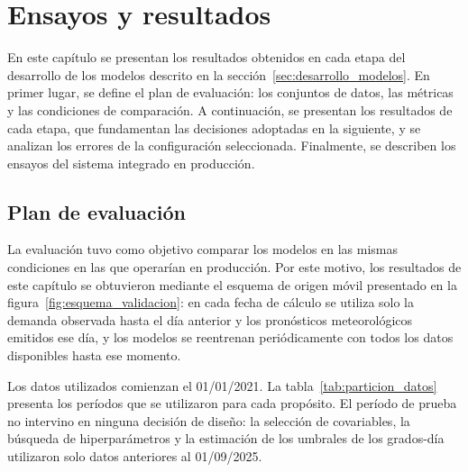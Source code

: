 
\chapter{Ensayos y resultados} %

\label{Chapter4} %

En este capítulo se presentan los resultados obtenidos en cada etapa del desarrollo de los modelos descrito en la sección~\ref{sec:desarrollo_modelos}. En primer lugar, se define el plan de evaluación: los conjuntos de datos, las métricas y las condiciones de comparación. A continuación, se presentan los resultados de cada etapa, que fundamentan las decisiones adoptadas en la siguiente, y se analizan los errores de la configuración seleccionada. Finalmente, se describen los ensayos del sistema integrado en producción.

\section{Plan de evaluación}
\label{sec:plan_evaluacion}

La evaluación tuvo como objetivo comparar los modelos en las mismas condiciones en las que operarían en producción. Por este motivo, los resultados de este capítulo se obtuvieron mediante el esquema de origen móvil presentado en la figura~\ref{fig:esquema_validacion}: en cada fecha de cálculo se utiliza solo la demanda observada hasta el día anterior y los pronósticos meteorológicos emitidos ese día, y los modelos se reentrenan periódicamente con todos los datos disponibles hasta ese momento.

Los datos utilizados comienzan el 01/01/2021. La tabla~\ref{tab:particion_datos} presenta los períodos que se utilizaron para cada propósito. El período de prueba no intervino en ninguna decisión de diseño: la selección de covariables, la búsqueda de hiperparámetros y la estimación de los umbrales de los grados-día utilizaron solo datos anteriores al 01/09/2025.

